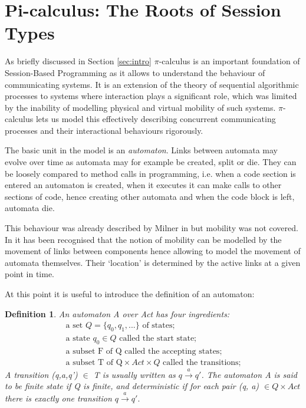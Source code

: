 
\section{Pi-calculus: The Roots of Session Types}
\label{sec:picalculus}
	
As briefly discussed in Section \ref{sec:intro} $\pi$-calculus is an important foundation of Session-Based Programming as it allows to understand the behaviour of communicating systems. It is an extension of the theory of sequential algorithmic processes to systems where interaction plays a significant role, which was limited by the inability of modelling physical and virtual mobility of such systems. $\pi$-calculus lets us model this effectively describing concurrent communicating processes and their interactional behaviours rigorously.

The basic unit in the model is an \textit{automaton}. Links between automata may evolve over time as automata may for example be created, split or die. They can be loosely compared to method calls in programming, i.e. when a code section is entered an automaton is created, when it executes it can make calls to other sections of code, hence creating other automata and when the code block is left, automata die.

This behaviour was already described by Milner in \cite{comm_sys_calc} but mobility was not covered. In \cite{pi-calculus} it has been recognised that the notion of mobility can be modelled by the movement of links between components hence allowing to model the movement of automata themselves. Their `location' is determined by the active links at a given point in time.

At this point it is useful to introduce the definition of an automaton:

\newtheorem{automaton}{Definition}
\begin{automaton}
An automaton A over Act has four ingredients:
\begin{align}
\mbox{a set }Q = \{q_0,q_1,...\}\mbox{ of states;}\nonumber\\
\mbox{a state } q_0 \in Q  \mbox{ called the start state;}\nonumber\\
\mbox{a subset F of Q called the accepting states;}\nonumber\\
\mbox{a subset T of Q} \times Act \times Q\mbox{ called the transitions;}\nonumber
\end{align}
A transition (q,a,q')  $\in$ T is usually written as $q \xrightarrow{a} q'$. The automaton A is said to be finite state if Q is finite, and deterministic if for each pair (q, a) $\in Q \times Act$ there is exactly one transition $q \xrightarrow{a} q'.$\cite{pi-calculus}
\end{automaton}

